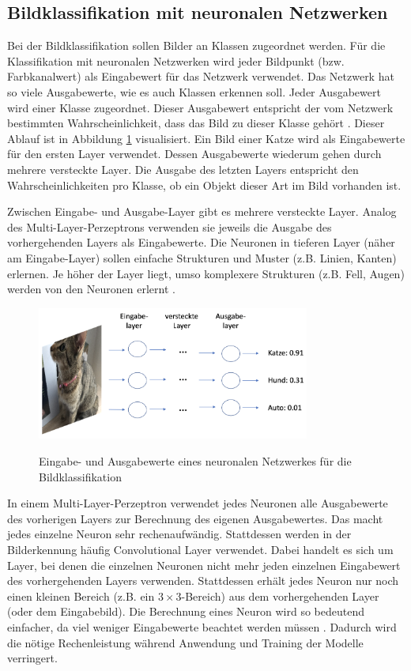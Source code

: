 \documentclass{FFHS_Thesis_Additions/ffhsthesis}
\begin{document}
\subsection{Bildklassifikation mit neuronalen Netzwerken}

Bei der Bildklassifikation sollen Bilder an Klassen zugeordnet werden. 
Für die Klassifikation mit neuronalen Netzwerken wird jeder Bildpunkt (bzw. Farbkanalwert) als Eingabewert für das Netzwerk verwendet. 
Das Netzwerk hat so viele Ausgabewerte, wie es auch Klassen erkennen soll. 
Jeder Ausgabewert wird einer Klasse zugeordnet. 
Dieser Ausgabewert entspricht der vom Netzwerk bestimmten Wahrscheinlichkeit, dass das Bild zu dieser Klasse gehört \cite{aurelien_geron_hands-machine_2017}. Dieser Ablauf ist in Abbildung \ref{fig_example_classifcation} visualisiert. Ein Bild einer Katze wird als Eingabewerte für den ersten Layer verwendet. Dessen Ausgabewerte wiederum gehen durch mehrere versteckte Layer. Die Ausgabe des letzten Layers entspricht den Wahrscheinlichkeiten pro Klasse, ob ein Objekt dieser Art im Bild vorhanden ist.

Zwischen Eingabe- und Ausgabe-Layer gibt es mehrere versteckte Layer. Analog des Multi-Layer-Perzeptrons verwenden sie jeweils die Ausgabe des vorhergehenden Layers als Eingabewerte. Die Neuronen in tieferen Layer (näher am Eingabe-Layer) sollen einfache Strukturen und Muster (z.B. Linien, Kanten) erlernen. Je höher der Layer liegt, umso komplexere Strukturen (z.B. Fell, Augen) werden von den Neuronen erlernt \cite{aurelien_geron_hands-machine_2017}.


\begin{figure}[h]
\caption{Eingabe- und Ausgabewerte eines neuronalen Netzwerkes für die Bildklassifikation}
\centering
\includegraphics[width=0.8\textwidth]{./images/image_classification}
\label{fig_example_classifcation}
\end{figure}

In einem Multi-Layer-Perzeptron verwendet jedes Neuronen alle Ausgabewerte des vorherigen Layers zur Berechnung des eigenen Ausgabewertes. 
Das macht jedes einzelne Neuron sehr rechenaufwändig. Stattdessen werden in der Bilderkennung häufig Convolutional Layer verwendet.
Dabei handelt es sich um Layer, bei denen die einzelnen Neuronen nicht mehr jeden einzelnen Eingabewert des vorhergehenden Layers verwenden.
Stattdessen erhält jedes Neuron nur noch einen kleinen Bereich (z.B. ein $3 \times 3$-Bereich) aus dem vorhergehenden Layer (oder dem Eingabebild). Die Berechnung eines Neuron wird so bedeutend einfacher, da viel weniger Eingabewerte beachtet werden müssen \cite{aurelien_geron_hands-machine_2017}. Dadurch wird die nötige Rechenleistung während Anwendung und Training der Modelle verringert.
\end{document}
